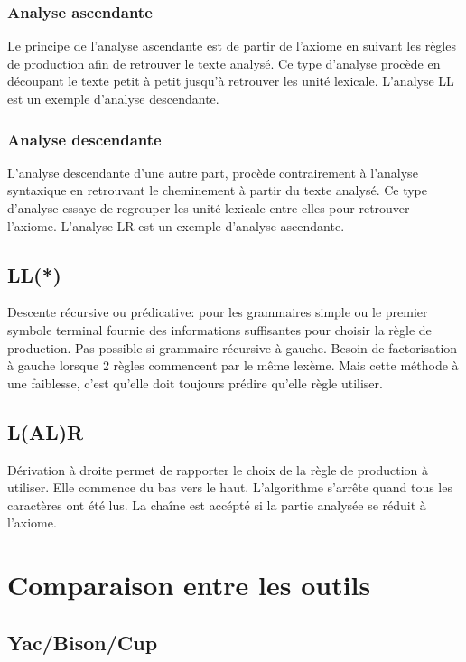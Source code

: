 \documentclass{article}
\begin{document}
\subsubsection{Analyse ascendante}
Le principe de l’analyse ascendante  est de partir de l’axiome en suivant les règles de production afin de retrouver le texte analysé. Ce type d’analyse procède en découpant le texte petit à petit jusqu'à retrouver les unité lexicale. L’analyse LL est un exemple d’analyse descendante.

\subsubsection{Analyse descendante}
L’analyse descendante d’une autre part, procède contrairement à l’analyse syntaxique en retrouvant le cheminement à partir du texte analysé. Ce type d’analyse essaye de regrouper les unité lexicale entre elles pour retrouver l’axiome. L’analyse LR est un exemple d’analyse ascendante.

\subsection{LL(*)}
Descente récursive ou prédicative: pour les grammaires simple ou le premier symbole terminal fournie des informations suffisantes pour choisir la règle de production.
Pas possible si grammaire récursive à gauche.
Besoin de factorisation à gauche lorsque 2 règles commencent par le même lexème.
Mais cette méthode à une faiblesse, c’est qu’elle doit toujours prédire qu’elle règle utiliser.

\subsection{L(AL)R}
Dérivation à droite permet de rapporter le choix de la règle de production à utiliser.
Elle commence du bas vers le haut.
L’algorithme s’arrête quand tous les caractères ont été lus. La chaîne est accépté si la partie analysée se réduit à l’axiome.

\section{Comparaison entre les outils}
\label{hints}

\subsection{Yac/Bison/Cup}
\end{document}
